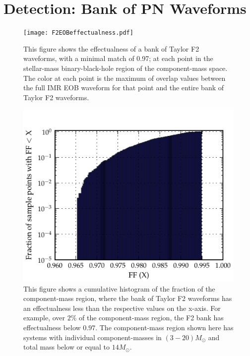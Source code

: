 \documentclass[aps,
prd,
amsmath,
amssymb,
twocolumn,
floatfix,
groupedaddress]{revtex4-1}
\begin{document}
\section{Detection: Bank of PN Waveforms}\label{sec:level1:Effectualness}
\begin{figure}
\centering
\texttt{[image: F2EOBeffectualness.pdf]}
\caption{\label{fig:match_f2eob_all}This figure shows the effectualness of a bank of Taylor F2 waveforms, with a minimal match of 0.97; at each point in the stellar-mass binary-black-hole region of the component-mass space. The color at each point is the maximum of overlap values between the full IMR EOB waveform for that point and the entire bank of Taylor F2 waveforms.}
\end{figure}
\begin{figure}
\centering
\includegraphics[scale=0.04, clip=false, totalheight=0.3\textheight, width=\columnwidth]{F2EOBhist.pdf}
\caption{\label{fig:cumhist_f2eob_cut14}This figure shows a cumulative histogram of the fraction of the component-mass region, where the bank of Taylor F2 waveforms has an effectualness less than the respective values on the x-axis. For example, over $2\%$ of the component-mass region, the F2 bank has effectualness below $0.97$. The component-mass region shown here has systems with individual component-masses in $(3-20)M_{\odot}$ and total mass below or equal to $14M_{\odot}$.}
\end{figure}
\end{document}
